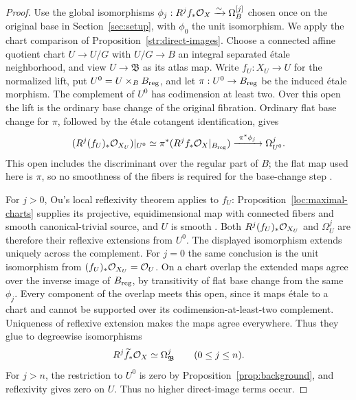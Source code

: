 \begin{proof}
Use the global isomorphisms
\(\phi_j:R^j f_*\mathcal O_X\xrightarrow{\sim}\Omega_B^{[j]}\)
chosen once on the original base in Section~\ref{sec:setup}, with
\(\phi_0\) the unit
isomorphism.  We apply the chart comparison of
Proposition~\ref{str:direct-images}.  Choose a connected affine quotient
chart \(U\to U/G\) with \(U/G\to B\) an integral separated étale
neighborhood, and view \(U\to\mathfrak B\) as its atlas map.
Write \(f_U:X_U\to U\) for the normalized lift,
put \(U^0=U\times_B B_{\rm reg}\), and let \(\pi:U^0\to B_{\rm reg}\)
be the induced étale morphism.  The complement of \(U^0\) has
codimension at least two.  Over this open the lift is the ordinary
base change of the original fibration.  Ordinary flat base change for
\(\pi\), followed by the étale cotangent identification, gives
\[
 (R^j(f_U)_*\mathcal O_{X_U})|_{U^0}
   \simeq\pi^*(R^j f_*\mathcal O_X|_{B_{\rm reg}})
   \xrightarrow{\ \pi^*\phi_j\ }\Omega^j_{U^0}.
\]
This open includes the discriminant over the regular part of \(B\);
the flat map used here is \(\pi\), so no smoothness of the fibers is
required for the base-change step \cite[Tag 02KH]{StacksProject}.

For \(j>0\), Ou's local reflexivity theorem applies to \(f_U\):
Proposition~\ref{loc:maximal-charts} supplies its projective,
equidimensional map with connected fibers and smooth canonical-trivial
source, and \(U\) is smooth
\cite[Theorem~1.3]{Ou2019}.  Both \(R^j(f_U)_*\mathcal O_{X_U}\) and
\(\Omega_U^j\) are therefore their reflexive extensions from \(U^0\).
The displayed isomorphism extends uniquely across the complement.
For \(j=0\) the same conclusion is the unit isomorphism from
\((f_U)_*\mathcal O_{X_U}=\mathcal O_U\).  On a chart overlap the extended maps
agree over the inverse image of \(B_{\rm reg}\), by transitivity of
flat base change from the same \(\phi_j\).  Every component of the
overlap meets this open, since it maps étale to a chart and cannot be
supported over its codimension-at-least-two complement.  Uniqueness
of reflexive extension makes the maps agree everywhere.  Thus they
glue to degreewise isomorphisms
\[
       R^j\widetilde f_*\mathcal O_X\simeq\Omega^j_{\mathfrak B}
                          \qquad(0\le j\le n).
\]
For \(j>n\), the restriction to \(U^0\) is zero by
Proposition~\ref{prop:background}, and reflexivity gives zero on \(U\).
Thus no higher direct-image terms occur.


\end{proof}
